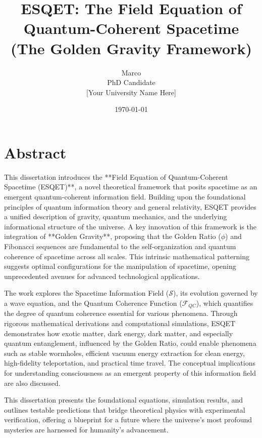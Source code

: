 \documentclass[12pt, letterpaper, oneside]{book} %
\title{\textbf{ESQET: The Field Equation of Quantum-Coherent Spacetime \\ (The Golden Gravity Framework)}}
\author{Marco \\ \small PhD Candidate \\ \small [Your University Name Here]} %
\date{\today} %
\begin{document}
\frontmatter %

\maketitle %

\newpage
\tableofcontents %
\newpage

\chapter*{Abstract}
This dissertation introduces the **Field Equation of Quantum-Coherent Spacetime (ESQET)**, a novel theoretical framework that posits spacetime as an emergent quantum-coherent information field. Building upon the foundational principles of quantum information theory and general relativity, ESQET provides a unified description of gravity, quantum mechanics, and the underlying informational structure of the universe. A key innovation of this framework is the integration of **Golden Gravity**, proposing that the Golden Ratio ($\phi$) and Fibonacci sequences are fundamental to the self-organization and quantum coherence of spacetime across all scales. This intrinsic mathematical patterning suggests optimal configurations for the manipulation of spacetime, opening unprecedented avenues for advanced technological applications.

The work explores the Spacetime Information Field ($\mathcal{S}$), its evolution governed by a wave equation, and the Quantum Coherence Function ($\mathcal{F}_{QC}$), which quantifies the degree of quantum coherence essential for various phenomena. Through rigorous mathematical derivations and computational simulations, ESQET demonstrates how exotic matter, dark energy, dark matter, and especially quantum entanglement, influenced by the Golden Ratio, could enable phenomena such as stable wormholes, efficient vacuum energy extraction for clean energy, high-fidelity teleportation, and practical time travel. The conceptual implications for understanding consciousness as an emergent property of this information field are also discussed.

This dissertation presents the foundational equations, simulation results, and outlines testable predictions that bridge theoretical physics with experimental verification, offering a blueprint for a future where the universe's most profound mysteries are harnessed for humanity's advancement.

\mainmatter %






\end{document}
